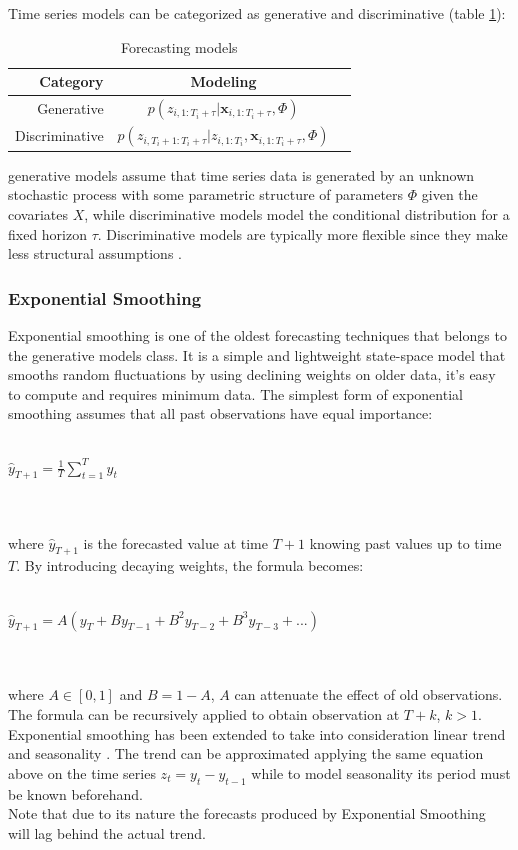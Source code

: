 \documentclass[a4paper]{article} %
\newcommand{\ra}[1]{\renewcommand{\arraystretch}{#1}}
\begin{document}
	Time series models can be categorized as generative and discriminative \cite{DiscriminativeGenerativeModels} (table \ref{table:generativediscriminative}):
	\begin{table}\centering \label{table:generativediscriminative}
		\ra{1.3}
		\begin{tabular}{@{}rcr@{}}\toprule
			Category & Modeling\\
			 \midrule
			 Generative & $p(z_{i,1:T_i+\tau} | \pmb{x}_{i, 1:T_i + \tau}, \Phi)$\\
			 Discriminative &  $p(z_{i,T_{i}+1:T_i+\tau} | z_{i, 1:T_i}, \pmb{x}_{i, 1:T_i + \tau}, \Phi)$\\
			\bottomrule
		\end{tabular}
		\caption{Forecasting models}
	\end{table}
	generative models assume that time series data is generated by an unknown stochastic process with some parametric structure of parameters $\Phi$ given the covariates $X$, while discriminative models model the conditional distribution for a fixed horizon $\tau$. Discriminative models are typically more flexible since they make less structural assumptions \cite{GluonTS}.
	
	
	\subsubsection{Exponential Smoothing} \label{sssec:exponential_smoothing}
	Exponential smoothing \cite{ExponentialSmoothingHoltCharles} is one of the oldest forecasting techniques that belongs to the generative models class. It is a simple and lightweight state-space model that smooths random fluctuations by using declining weights on older data, it's easy to compute and requires minimum data.
	The simplest form of exponential smoothing assumes that all past observations have equal importance:\\\\
	\centerline{$\hat{y}_{T+1} = \frac{1}{T} \sum_{t=1}^{T}y_t$}\\\\
	where $\hat{y}_{T+1}$ is the forecasted value at time $T+1$ knowing past values up to time $T$. By introducing decaying weights, the formula becomes:\\\\
		\centerline{$\hat{y}_{T+1} = A(y_T + B y_{T-1} + B^2 y_{T-2} + B^3 y_{T-3} + ...)$ }\\\\
	where $A \in [0,1]$ and $B=1-A$, $A$ can attenuate the effect of old observations. The formula can be recursively applied to obtain observation at $T+k$, $k>1$. \\
	Exponential smoothing has been extended to take into consideration linear trend and seasonality \cite{ExponentialSmoothingHoltCharles}. The trend can be approximated applying the same equation above on the time series $z_t = y_t - y_{t-1}$ while to model seasonality its period must be known beforehand.\\
	Note that due to its nature the forecasts produced by Exponential Smoothing will lag behind the actual trend.
	
\end{document}
